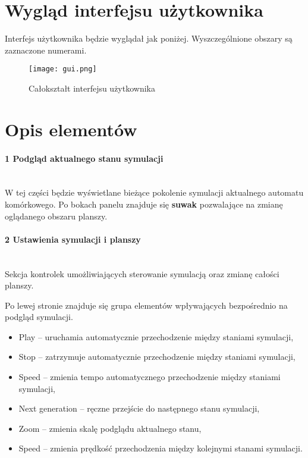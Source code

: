 \documentclass{report}
\begin{document}
\section{Wygląd interfejsu użytkownika} \label{sec:wyglad-gui}
Interfejs użytkownika będzie wyglądał jak poniżej. Wyszczególnione obszary są zaznaczone numerami.
\begin{figure}[H]
    \centering
    \texttt{[image: gui.png]} %
    \caption{Całokształt interfejsu użytkownika}
\end{figure}

\section{Opis elementów}
\paragraph{1 Podgląd aktualnego stanu symulacji} \mbox{} \\
W tej części będzie wyświetlane bieżące pokolenie symulacji aktualnego automatu komórkowego. Po bokach panelu znajduje się \textbf{suwak} pozwalające na zmianę oglądanego obszaru planszy.

\paragraph{2 Ustawienia symulacji i planszy} \mbox{} \\
Sekcja kontrolek umożliwiających sterowanie symulacją oraz zmianę całości planszy.

Po lewej stronie znajduje się grupa elementów wpływających bezpośrednio na podgląd symulacji.
\begin{itemize}
    \item Play -- uruchamia automatycznie przechodzenie między staniami symulacji,
    \item Stop -- zatrzymuje automatycznie przechodzenie między staniami symulacji,
    \item Speed -- zmienia tempo automatycznego przechodzenie między staniami symulacji,
    \item Next generation -- ręczne przejście do następnego stanu symulacji,
    \item Zoom -- zmienia skalę podglądu aktualnego stanu,
    \item Speed -- zmienia prędkość przechodzenia między kolejnymi stanami symulacji.
\end{itemize}
\end{document}
